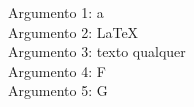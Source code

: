 \documentclass{article}
\newcommand{\comando}[5]{%
		\noindent
		Argumento 1: #1\\
		Argumento 2: #2\\
		Argumento 3: #3\\
		Argumento 4: #4\\
		Argumento 5: #5\par
	}
\begin{document}
	\comando a    \LaTeX   {texto qualquer}  FG
\end{document}
